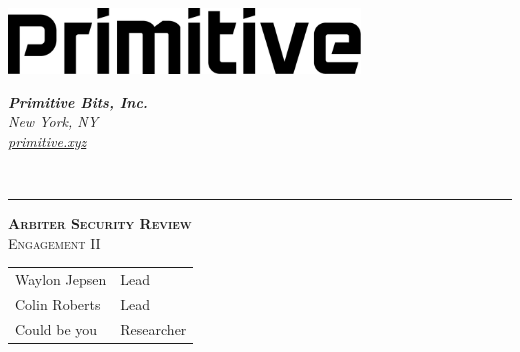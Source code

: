\documentclass[14pt]{extarticle}
\begin{document}


\begin{titlepage}
    \begin{minipage}[c]{0.4\textwidth}
      \includegraphics[width=0.70\textwidth]{report/assets/img/primitive-wordmark-dark.png} \\  %
    \end{minipage}
    \hspace{0.4\textwidth}
    \begin{minipage}[c]{0.2\textwidth}
      \begin{flushleft}
          \small
          \textit{\textbf{Primitive Bits, Inc.}\\  %
          New York, NY\\
          \href{http://primitive.xyz}{primitive.xyz}\\}
      \end{flushleft}
    \end{minipage} \\
    \begin{flushleft}
      {\small\color{gray}{
      \today}}
      \vspace{2cm}  %
      \hspace{2cm}  %
      \hspace{2cm}  %
      \hrule 
      \vspace{0.5cm}  %
      \hspace{2cm}  %
      \hspace{2cm}  %
    \end{flushleft}
    \begin{flushleft}
      \textsc{\LARGE \bfseries Arbiter Security Review}\\[0.5 cm]  %
      \textsc{\large Engagement II}\\[2.0 cm]  %
  
      \begin{tabular}{ll}  %
        Waylon Jepsen & Lead \\
        Colin Roberts & Lead \\
        Could be you & Researcher \\
      \end{tabular}
  
      \vfill
  
    \end{flushleft}
  \end{titlepage}
\end{document}
